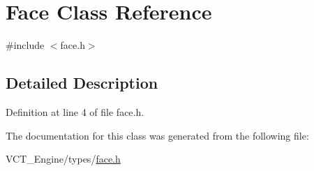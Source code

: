 \hypertarget{class_face}{}\section{Face Class Reference}
\label{class_face}


{\ttfamily \#include $<$face.\+h$>$}



\subsection{Detailed Description}


Definition at line 4 of file face.\+h.



The documentation for this class was generated from the following file\+:\begin{DoxyCompactItemize}
\item 
V\+C\+T\+\_\+\+Engine/types/\hyperlink{face_8h}{face.\+h}\end{DoxyCompactItemize}
